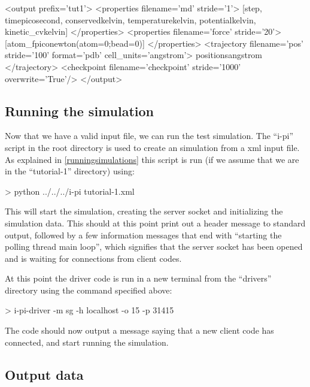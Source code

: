 \documentclass[11pt,english,fleqn]{report}
\newenvironment{code}{%
\footnotesize 
\verbatim
}{
\endverbatim
\normalsize
}
\begin{document}
\begin{code}
<output prefix='tut1'>
   <properties filename='md' stride='1'> 
      [step, time{picosecond}, conserved{kelvin}, 
       temperature{kelvin}, potential{kelvin}, kinetic_cv{kelvin}] 
   </properties>
   <properties filename='force' stride='20'> 
      [atom_f{piconewton}(atom=0;bead=0)] 
   </properties>
   <trajectory filename='pos' stride='100' format='pdb' cell_units='angstrom'> 
      positions{angstrom} 
   </trajectory>
   <checkpoint filename='checkpoint' stride='1000' overwrite='True'/>
</output>
\end{code}

\subsection{Running the simulation}

\label{run1}

Now that we have a valid input file, we can run the test simulation.
The {}``i-pi'' script in the root directory is used to create an
\ipi simulation from a xml input file. As explained in
\ref{runningsimulations} this script is run 
(if we assume that we are in the {}``tutorial-1'' directory) using:

\begin{code}
> python ../../../i-pi tutorial-1.xml
\end{code}

This will start the \ipi simulation, creating the server socket and
initializing the simulation data. This should at this point print
out a header message to standard output, followed by a few information
messages that end with {}``starting the polling thread main loop'',
which signifies that the server socket has been opened and is waiting
for connections from client codes.

At this point the driver code is run in a new terminal 
from the {}``drivers'' directory using the command
specified above:

\begin{code}
> i-pi-driver -m sg -h localhost -o 15 -p 31415
\end{code}

The \ipi code should now output a message saying that a new client
code has connected, and start running the simulation.

\subsection{Output data}
\end{document}
